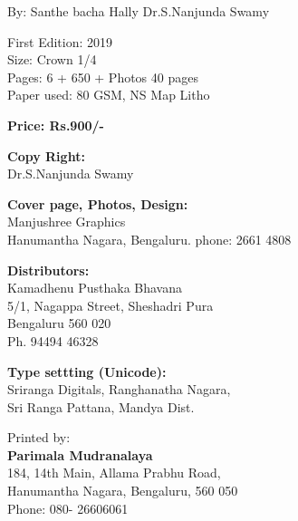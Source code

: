 


By: Santhe bacha Hally Dr.S.Nanjunda Swamy


\begin{center}
First Edition: 2019\\ Size: Crown 1/4\\ Pages: 6 + 650 + Photos 40 pages\\ Paper used: 80 GSM, NS Map Litho
\end{center}

\begin{center}
\textbf{Price: Rs.900/-}
\end{center}

\begin{center}
\textbf{Copy Right:}\\ Dr.S.Nanjunda Swamy
\end{center}

\begin{center}
\textbf{Cover page, Photos, Design:}\\ Manjushree Graphics\\ Hanumantha Nagara, Bengaluru. phone: 2661 4808
\end{center}

\begin{center}
\textbf{Distributors:} \\ Kamadhenu Pusthaka Bhavana\\ 5/1, Nagappa Street, Sheshadri Pura\\ Bengaluru 560 020\\ Ph. 94494 46328
\end{center}

\begin{center}
\textbf{Type settting (Unicode):}\\ Sriranga Digitals, Ranghanatha Nagara,\\ Sri Ranga Pattana, Mandya Dist.
\end{center}

\begin{center}
Printed by:\\\textbf{Parimala Mudranalaya}\\ 184, 14th Main, Allama Prabhu Road,\\ Hanumantha Nagara, Bengaluru, 560 050\\ Phone: 080- 26606061
\end{center}

